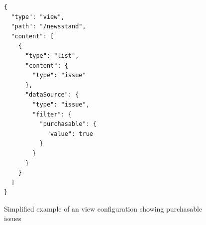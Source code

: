 \begin{figure}
  \lstset{language=json,basicstyle=\footnotesize,numbers=left,showstringspaces=false,frame=single}
  \begin{lstlisting}
{
  "type": "view",
  "path": "/newsstand",
  "content": [
    {
      "type": "list",
      "content": {
        "type": "issue"
      },
      "dataSource": {
        "type": "issue",
        "filter": {
          "purchasable": {
            "value": true
          }
        }
      }
    }
  ]
}
  \end{lstlisting}
  \caption{Simplified example of an view configuration showing purchasable issues}
\end{figure}